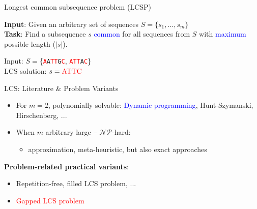 \documentclass{beamer}
\begin{document}
\begin{frame}{Longest common subsequence problem (LCSP)}
   
    
    \begin{definition}[LCSP]
        \textbf{Input}: Given an arbitrary set of sequences $S=\{s_1, \ldots, s_m\}$ \\
        \textbf{Task}: Find a   subsequence $s$  \textcolor{blue}{common} for all sequences from $S$ with \textcolor{blue}{maximum} possible length ($|s|$). 
    \end{definition} \vspace{0.5cm}
    \begin{example}
       Input: $S=$\{\texttt{\textcolor{red}{A}A\textcolor{red}{T}\textcolor{red}{T}G\textcolor{red}{C}}, \texttt{\textcolor{red}{A}\textcolor{red}{T}\textcolor{red}{T}A\textcolor{red}{C}}\} \\ 
       LCS solution: $s=\text{\textcolor{red}{ATTC}}$
    \end{example}
        \vspace{0.3cm}
\end{frame}

\begin{frame}{LCS: Literature \& Problem Variants }
  \begin{itemize}
  \item For $m=2$, polynomially solvable: \textcolor{blue}{Dynamic programming}, Hunt-Szymanski, Hirschenberg,  ... 
 \vspace{0.2cm}
  \item When $m$ arbitrary large -- $\mathcal{NP}$-hard:
   \begin{itemize}
   \item %
    approximation, meta-heuristic, but also exact approaches   
   \end{itemize}  
  \end{itemize}\vspace{0.5cm}
  
  \textbf{Problem-related practical variants}:
  \begin{itemize}
  		\item   Repetition-free, filled LCS problem, ...
  		\item \textcolor{red}{Gapped LCS problem}
  \end{itemize}
\end{frame}
\end{document}
